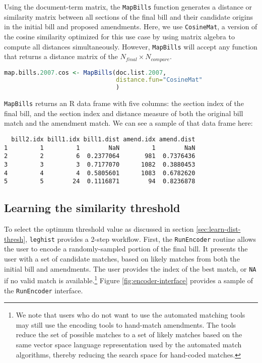 \documentclass[11pt]{article}
\begin{document}
Using the document-term matrix, the \texttt{MapBills} function
generates a distance or similarity matrix between all sections of the
final bill and their candidate origins in the initial bill and
proposed amendments. Here, we use
\texttt{CosineMat}, a version of the cosine similarity
optimized for this use case by using matrix algebra to compute all
distances simultaneously. However, \texttt{MapBills} will accept any function that returns a
distance matrix of the $N_{final} \times N_{compare}$.

\begin{lstlisting}[language=R, numbers=none]
map.bills.2007.cos <- MapBills(doc.list.2007,
                               distance.fun="CosineMat"
                               )
\end{lstlisting}

\texttt{MapBills} returns an R data frame with five columns: the
section index of the final bill, and the section index and distance
measure of both the original bill match and the amendment match. We
can see a sample of that data frame here:

\begin{verbatim}
  bill2.idx bill1.idx bill1.dist amend.idx amend.dist
1         1         1        NaN         1        NaN
2         2         6  0.2377064       981  0.7376436
3         3         3  0.7177070      1082  0.3880453
4         4         4  0.5805601      1083  0.6782620
5         5        24  0.1116871        94  0.8236878
\end{verbatim}


\subsection{Learning the similarity threshold}
\label{sec:learn-simil-thresh}

To select the optimum threshold value as discussed in section
\ref{sec:learn-dist-thresh}, \texttt{leghist} 
provides a 2-step workflow. First, the \texttt{RunEncoder} routine allows the user to
encode a randomly-sampled portion of the final bill. It presents the
user with a set of candidate matches, based on likely matches from
both the initial bill and amendments. The user provides the index of
the best match, or \texttt{NA} if no valid match is
available.\footnote{We note that users who do not want to use the
  automated matching tools may still use the encoding tools to
  hand-match amendments. The tools reduce the set of possible matches
  to a set of likely matches based on the same vector space language
  representation used by the automated match algorithms, thereby
  reducing the search space for hand-coded matches.} Figure
\ref{fig:encoder-interface} provides a sample of the 
\texttt{RunEncoder} interface.
\end{document}
